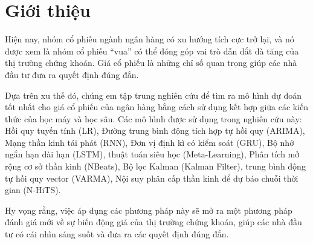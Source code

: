 \section{Giới thiệu}
\label{sec:introduction}
Hiện nay, nhóm cổ phiếu ngành ngân hàng có xu hướng tích cực trở lại, và nó được xem là nhóm cổ phiếu “vua” có thể đóng góp vai trò dẫn dắt đà tăng của thị trường chứng khoán. Giá cổ phiếu là những chỉ số quan trọng giúp các nhà đầu tư đưa ra quyết định đúng đắn.
\par
Dựa trên xu thế đó, chúng em tập trung nghiên cứu để tìm ra mô hình dự đoán tốt nhất cho giá cổ phiếu của ngân hàng bằng cách sử dụng kết hợp giữa các kiến thức của học máy và học sâu. Các mô hình được sử dụng trong nghiên cứu này: Hồi quy tuyến tính (LR), Đường trung bình động tích hợp tự hồi quy (ARIMA), Mạng thần kinh tái phát (RNN), Đơn vị định kì có kiểm soát (GRU), Bộ nhớ ngắn hạn dài hạn (LSTM), thuật toán siêu học (Meta-Learning), Phân tích mở rộng cơ sở thần kinh (NBeats), Bộ lọc Kalman (Kalman Filter), trung bình động tự hồi quy vector (VARMA), Nội suy phân cấp thần kinh để dự báo chuỗi thời gian (N-HiTS).
\par
Hy vọng rằng, việc áp dụng các phương pháp này sẽ mở ra một phương pháp đánh giá mới về sự biến động giá của thị trường chứng khoán, giúp các nhà đầu tư có cái nhìn sáng suốt và đưa ra các quyết định đúng đắn.

